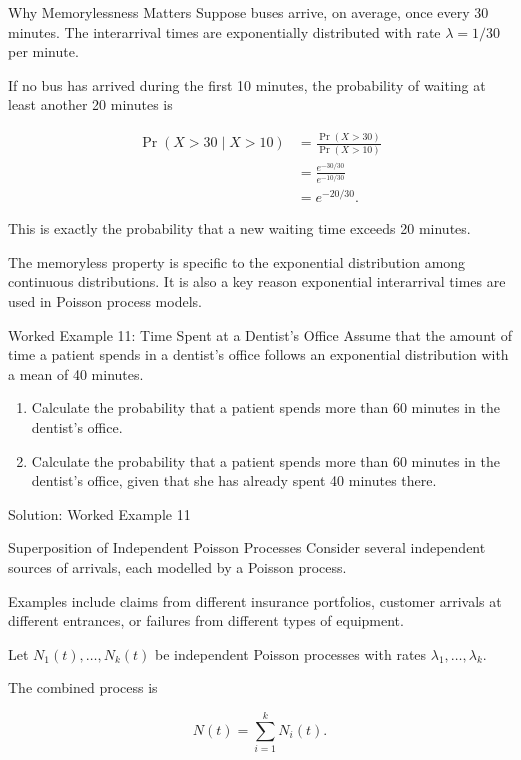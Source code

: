 \documentclass[
  ignorenonframetext,
  aspectratio=169,
]{beamer}
\begin{document}
\begin{frame}{Why Memorylessness Matters}
\protect{}\label{why-memorylessness-matters}
Suppose buses arrive, on average, once every 30 minutes. The
interarrival times are exponentially distributed with rate
\(\lambda=1/30\) per minute.

If no bus has arrived during the first 10 minutes, the probability of
waiting at least another 20 minutes is

\[
\begin{aligned}
\Pr(X>30\mid X>10)
&=\frac{\Pr(X>30)}{\Pr(X>10)}\\
&=\frac{e^{-30/30}}{e^{-10/30}}\\
&=e^{-20/30}.
\end{aligned}
\]

This is exactly the probability that a new waiting time exceeds 20
minutes.

The memoryless property is specific to the exponential distribution
among continuous distributions. It is also a key reason exponential
interarrival times are used in Poisson process models.
\end{frame}

\begin{frame}{Worked Example 11: Time Spent at a Dentist's Office}
\protect{}\label{worked-example-11-time-spent-at-a-dentists-office}
Assume that the amount of time a patient spends in a dentist's office
follows an exponential distribution with a mean of 40 minutes.

\begin{enumerate}
\item
  Calculate the probability that a patient spends more than 60 minutes
  in the dentist's office.
\item
  Calculate the probability that a patient spends more than 60 minutes
  in the dentist's office, given that she has already spent 40 minutes
  there.
\end{enumerate}
\end{frame}

\begin{frame}{Solution: Worked Example 11}
\protect{}\label{solution-worked-example-11}
\end{frame}

\begin{frame}{Superposition of Independent Poisson Processes}
\protect{}\label{superposition-of-independent-poisson-processes}
Consider several independent sources of arrivals, each modelled by a
Poisson process.

Examples include claims from different insurance portfolios, customer
arrivals at different entrances, or failures from different types of
equipment.

Let \(N_1(t),\ldots,N_k(t)\) be independent Poisson processes with rates
\(\lambda_1,\ldots,\lambda_k\).

The combined process is

\[
N(t)=\sum_{i=1}^{k}N_i(t).
\]
\end{frame}
\end{document}
